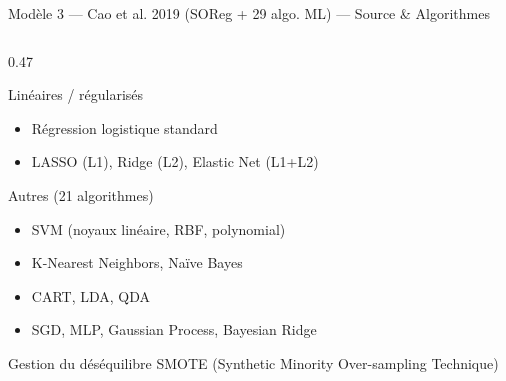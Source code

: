 \documentclass[aspectratio=169]{beamer}
\newcommand{\tightlist}{%
  \setlength{\itemsep}{1pt}\setlength{\parskip}{0pt}%
  \setlength{\parsep}{0pt}\setlength{\topsep}{2pt}}
\begin{document}
\begin{frame}[shrink=5]{Modèle 3 --- Cao et al. 2019 (SOReg + 29 algo. ML) --- Source \& Algorithmes}
\begin{columns}[T]
\begin{column}{0.47\textwidth}
\begin{block}{Linéaires / régularisés}
        \footnotesize\tightlist
        \begin{itemize}\tightlist
          \item Régression logistique standard
          \item LASSO (L1), Ridge (L2), Elastic Net (L1+L2)
        \end{itemize}
      \end{block}
      \vspace{0.1em}
      \begin{block}{Autres (21 algorithmes)}
        \footnotesize\tightlist
        \begin{itemize}\tightlist
          \item SVM (noyaux linéaire, RBF, polynomial)
          \item K-Nearest Neighbors, Naïve Bayes
          \item CART, LDA, QDA
          \item SGD, MLP, Gaussian Process, Bayesian Ridge
        \end{itemize}
      \end{block}
      \vspace{0.1em}
      \begin{block}{Gestion du déséquilibre}
        \footnotesize SMOTE (Synthetic Minority Over-sampling Technique)
      \end{block}
    \end{column}
  \end{columns}
\end{frame}
\end{document}
